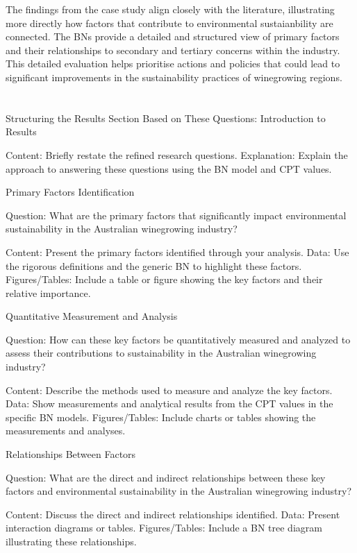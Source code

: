 The findings from the case study align closely with the literature, illustrating more directly how factors that contribute to environmental sustaianbility are connected. The BNs provide a detailed and structured view of primary factors and their relationships to secondary and tertiary concerns within the industry. This detailed evaluation helps prioritise actions and policies that could lead to significant improvements in the sustainability practices of winegrowing regions.

\section{}

Structuring the Results Section Based on These Questions:
Introduction to Results

    Content: Briefly restate the refined research questions.
    Explanation: Explain the approach to answering these questions using the BN model and CPT values.

Primary Factors Identification

Question: What are the primary factors that significantly impact environmental sustainability in the Australian winegrowing industry?

    Content: Present the primary factors identified through your analysis.
    Data: Use the rigorous definitions and the generic BN to highlight these factors.
    Figures/Tables: Include a table or figure showing the key factors and their relative importance.

Quantitative Measurement and Analysis

Question: How can these key factors be quantitatively measured and analyzed to assess their contributions to sustainability in the Australian winegrowing industry?

    Content: Describe the methods used to measure and analyze the key factors.
    Data: Show measurements and analytical results from the CPT values in the specific BN models.
    Figures/Tables: Include charts or tables showing the measurements and analyses.

Relationships Between Factors

Question: What are the direct and indirect relationships between these key factors and environmental sustainability in the Australian winegrowing industry?

    Content: Discuss the direct and indirect relationships identified.
    Data: Present interaction diagrams or tables.
    Figures/Tables: Include a BN tree diagram illustrating these relationships.

